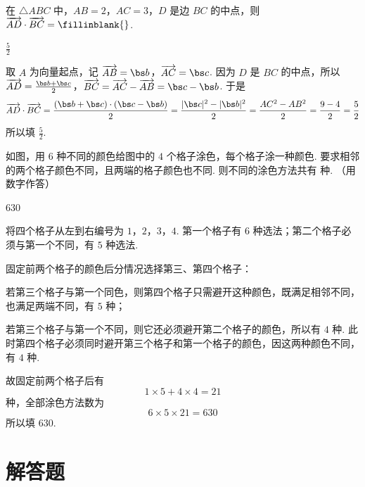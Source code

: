 \begin{problem}
在 \(\triangle ABC\) 中，\(AB = 2\)，\(AC = 3\)，\(D\) 是边 \(BC\) 的中点，则 \(\overrightarrow{AD} \cdot \overrightarrow{BC} =\fillinblank{}\).
\end{problem}

\begin{answer}
\(\frac52\)
\end{answer}

\begin{solution}
取 \(A\) 为向量起点，记
\(\overrightarrow{AB}=\bs b\)，\(\overrightarrow{AC}=\bs c\).
因为 \(D\) 是 \(BC\) 的中点，所以
\(\overrightarrow{AD}=\frac{\bs b+\bs c}{2}\)，\(\overrightarrow{BC}=\overrightarrow{AC}-\overrightarrow{AB}=\bs c-\bs b\).
于是
\[
\overrightarrow{AD}\cdot\overrightarrow{BC}=\frac{(\bs b+\bs c)\cdot(\bs c-\bs b)}2=\frac{|\bs c|^2-|\bs b|^2}{2}=\frac{AC^2-AB^2}{2}=\frac{9-4}{2}=\frac52
\]
所以填 \(\frac52\).
\end{solution}

\begin{problem}
如图，用 \(6\) 种不同的颜色给图中的 \(4\) 个格子涂色，每个格子涂一种颜色. 要求相邻的两个格子颜色不同，且两端的格子颜色也不同. 则不同的涂色方法共有\fillinblank{} 种. （用数字作答）

\end{problem}

\begin{answer}
\(630\)
\end{answer}

\begin{solution}
将四个格子从左到右编号为 \(1\)，\(2\)，\(3\)，\(4\). 第一个格子有 \(6\) 种选法；第二个格子必须与第一个不同，有 \(5\) 种选法.

固定前两个格子的颜色后分情况选择第三、第四个格子：

若第三个格子与第一个同色，则第四个格子只需避开这种颜色，既满足相邻不同，也满足两端不同，有 \(5\) 种；

若第三个格子与第一个不同，则它还必须避开第二个格子的颜色，所以有 \(4\) 种. 此时第四个格子必须同时避开第三个格子和第一个格子的颜色，因这两种颜色不同，有 \(4\) 种.

故固定前两个格子后有
\[
1\times5+4\times4=21
\]
种，全部涂色方法数为
\[
6\times5\times21=630
\]
所以填 \(630\).
\end{solution}

\section{解答题}

